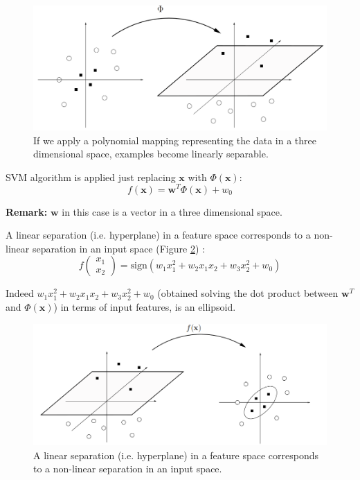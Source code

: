 \begin{figure}
    \centering
    \includegraphics[width=\textwidth]{images/esempio_polynomial_mapping.png}
    \caption{If we apply a polynomial mapping representing the data in a three dimensional space, examples become linearly separable.}
    \label{fig:example_polinomial_mapping}
\end{figure}

SVM algorithm is applied just replacing $\pmb{x}$ with $\Phi(\pmb{x})$:
\begin{equation}
    f(\pmb{x}) = \pmb{w}^T \Phi(\pmb{x}) + w_0
\end{equation}

\textbf{Remark:} $\pmb{w}$ in this case is a vector in a three dimensional space. \newline

A linear separation (i.e. hyperplane) in a feature space corresponds to a non-linear separation in an input space (Figure \ref{fig:fromHighToLowSpace}) :
$$f(\begin{matrix} x_1 \\ x_2\end{matrix}) = \text{sign}(w_1 x_1^2 + w_2 x_1 x_2 + w_3 x_2^2 + w_0)$$

Indeed $w_1 x_1^2 + w_2 x_1 x_2 + w_3 x_2^2 + w_0$ (obtained solving the dot product between $\pmb{w}^T$ and $\Phi(\pmb{x})$) in terms of input features, is an ellipsoid. \newline

\begin{figure}
    \centering
    \includegraphics[width=\textwidth]{images/fromHighToLowSpace.png}
    \caption{A linear separation (i.e. hyperplane) in a feature space corresponds to a non-linear separation in an input space.}
    \label{fig:fromHighToLowSpace}
\end{figure}

